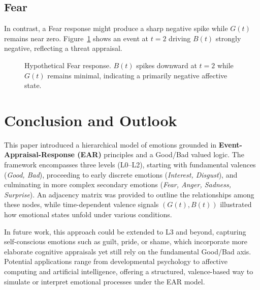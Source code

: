 \documentclass[11pt]{article}
\begin{document}
\subsection{Fear}
In contrast, a Fear response might produce a sharp negative spike while \(G(t)\) remains near zero. Figure~\ref{fig:fear-waveform} shows an event at \(t=2\) driving \(B(t)\) strongly negative, reflecting a threat appraisal.

\begin{figure}[htbp]
\centering
{}
\caption{Hypothetical Fear response. $B(t)$ spikes downward at $t=2$ while $G(t)$ remains minimal, indicating a primarily negative affective state.}
\label{fig:fear-waveform}
\end{figure}

\section{Conclusion and Outlook}
\label{sec:conclusion}
This paper introduced a hierarchical model of emotions grounded in \textbf{Event-Appraisal-Response (EAR)} principles and a Good/Bad valued logic. The framework encompasses three levels (L0--L2), starting with fundamental valences (\textit{Good, Bad}), proceeding to early discrete emotions (\textit{Interest, Disgust}), and culminating in more complex secondary emotions (\textit{Fear, Anger, Sadness, Surprise}). An adjacency matrix was provided to outline the relationships among these nodes, while time-dependent valence signals \((G(t), B(t))\) illustrated how emotional states unfold under various conditions.

In future work, this approach could be extended to L3 and beyond, capturing self-conscious emotions such as guilt, pride, or shame, which incorporate more elaborate cognitive appraisals yet still rely on the fundamental Good/Bad axis. Potential applications range from developmental psychology to affective computing and artificial intelligence, offering a structured, valence-based way to simulate or interpret emotional processes under the EAR model.
\end{document}
